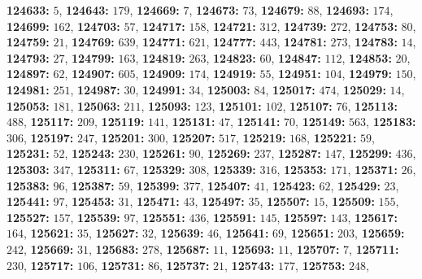 \textsf{\bfseries 124633:} $5$, \textsf{\bfseries 124643:} $179$, \textsf{\bfseries 124669:} $7$, \textsf{\bfseries 124673:} $73$, \textsf{\bfseries 124679:} $88$, \textsf{\bfseries 124693:} $174$, \textsf{\bfseries 124699:} $162$, \textsf{\bfseries 124703:} $57$, \textsf{\bfseries 124717:} $158$, \textsf{\bfseries 124721:} $312$, \textsf{\bfseries 124739:} $272$, \textsf{\bfseries 124753:} $80$, \textsf{\bfseries 124759:} $21$, \textsf{\bfseries 124769:} $639$, \textsf{\bfseries 124771:} $621$, \textsf{\bfseries 124777:} $443$, \textsf{\bfseries 124781:} $273$, \textsf{\bfseries 124783:} $14$, \textsf{\bfseries 124793:} $27$, \textsf{\bfseries 124799:} $163$, \textsf{\bfseries 124819:} $263$, \textsf{\bfseries 124823:} $60$, \textsf{\bfseries 124847:} $112$, \textsf{\bfseries 124853:} $20$, \textsf{\bfseries 124897:} $62$, \textsf{\bfseries 124907:} $605$, \textsf{\bfseries 124909:} $174$, \textsf{\bfseries 124919:} $55$, \textsf{\bfseries 124951:} $104$, \textsf{\bfseries 124979:} $150$, \textsf{\bfseries 124981:} $251$, \textsf{\bfseries 124987:} $30$, \textsf{\bfseries 124991:} $34$, \textsf{\bfseries 125003:} $84$, \textsf{\bfseries 125017:} $474$, \textsf{\bfseries 125029:} $14$, \textsf{\bfseries 125053:} $181$, \textsf{\bfseries 125063:} $211$, \textsf{\bfseries 125093:} $123$, \textsf{\bfseries 125101:} $102$, \textsf{\bfseries 125107:} $76$, \textsf{\bfseries 125113:} $488$, \textsf{\bfseries 125117:} $209$, \textsf{\bfseries 125119:} $141$, \textsf{\bfseries 125131:} $47$, \textsf{\bfseries 125141:} $70$, \textsf{\bfseries 125149:} $563$, \textsf{\bfseries 125183:} $306$, \textsf{\bfseries 125197:} $247$, \textsf{\bfseries 125201:} $300$, \textsf{\bfseries 125207:} $517$, \textsf{\bfseries 125219:} $168$, \textsf{\bfseries 125221:} $59$, \textsf{\bfseries 125231:} $52$, \textsf{\bfseries 125243:} $230$, \textsf{\bfseries 125261:} $90$, \textsf{\bfseries 125269:} $237$, \textsf{\bfseries 125287:} $147$, \textsf{\bfseries 125299:} $436$, \textsf{\bfseries 125303:} $347$, \textsf{\bfseries 125311:} $67$, \textsf{\bfseries 125329:} $308$, \textsf{\bfseries 125339:} $316$, \textsf{\bfseries 125353:} $171$, \textsf{\bfseries 125371:} $26$, \textsf{\bfseries 125383:} $96$, \textsf{\bfseries 125387:} $59$, \textsf{\bfseries 125399:} $377$, \textsf{\bfseries 125407:} $41$, \textsf{\bfseries 125423:} $62$, \textsf{\bfseries 125429:} $23$, \textsf{\bfseries 125441:} $97$, \textsf{\bfseries 125453:} $31$, \textsf{\bfseries 125471:} $43$, \textsf{\bfseries 125497:} $35$, \textsf{\bfseries 125507:} $15$, \textsf{\bfseries 125509:} $155$, \textsf{\bfseries 125527:} $157$, \textsf{\bfseries 125539:} $97$, \textsf{\bfseries 125551:} $436$, \textsf{\bfseries 125591:} $145$, \textsf{\bfseries 125597:} $143$, \textsf{\bfseries 125617:} $164$, \textsf{\bfseries 125621:} $35$, \textsf{\bfseries 125627:} $32$, \textsf{\bfseries 125639:} $46$, \textsf{\bfseries 125641:} $69$, \textsf{\bfseries 125651:} $203$, \textsf{\bfseries 125659:} $242$, \textsf{\bfseries 125669:} $31$, \textsf{\bfseries 125683:} $278$, \textsf{\bfseries 125687:} $11$, \textsf{\bfseries 125693:} $11$, \textsf{\bfseries 125707:} $7$, \textsf{\bfseries 125711:} $230$, \textsf{\bfseries 125717:} $106$, \textsf{\bfseries 125731:} $86$, \textsf{\bfseries 125737:} $21$, \textsf{\bfseries 125743:} $177$, \textsf{\bfseries 125753:} $248$, 
